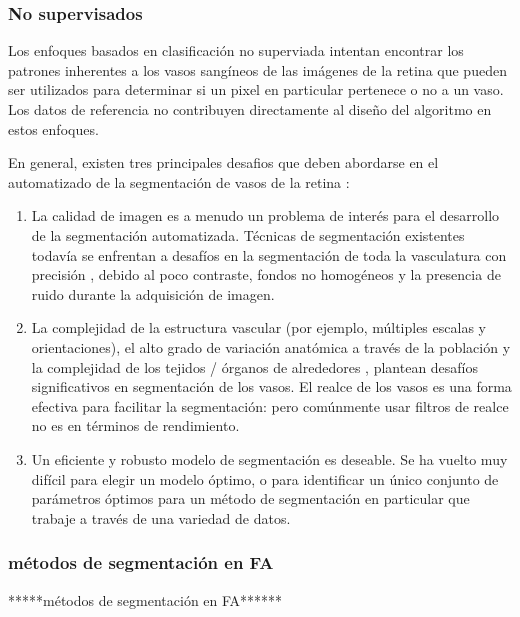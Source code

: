 	\subsubsection{No supervisados}


Los enfoques basados en clasificaci\'on no superviada intentan encontrar los patrones inherentes a los vasos sang\'ineos de las im\'agenes de la retina que pueden ser utilizados para determinar si un pixel en particular pertenece o no a un vaso. Los datos de referencia no contribuyen directamente al dise\~no del algoritmo en estos enfoques. 

En general, existen tres principales desafios que deben abordarse en el automatizado de la segmentación de vasos de la retina :
\begin{enumerate}
\item La calidad de imagen es a menudo un problema de interés para el desarrollo de la segmentación automatizada. Técnicas de segmentación existentes todavía se enfrentan a desafíos en la segmentación de toda la vasculatura con precisión , debido al poco contraste, fondos no homogéneos y la presencia de ruido durante la adquisición de imagen.
\item La complejidad de la estructura vascular (por ejemplo, múltiples escalas y orientaciones), el alto grado de variación anatómica a través de la población y la complejidad de los tejidos / órganos de alrededores
, plantean desafíos significativos en segmentación de los vasos. El realce de los vasos es
una forma efectiva para facilitar la segmentación:  pero comúnmente usar filtros de realce no es en términos de rendimiento.
\item Un eficiente y robusto modelo de segmentación  es deseable. Se ha vuelto muy difícil
para elegir un modelo óptimo, o para identificar un único conjunto de parámetros óptimos para un método de segmentación en particular que trabaje a través de una variedad de datos.\cite{zhao2015retinal}
\end{enumerate}



\subsubsection{métodos de segmentación en FA}
*****métodos de segmentación en FA******
